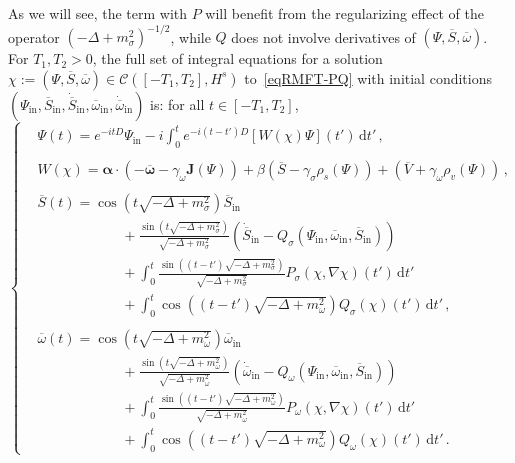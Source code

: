 \documentclass[10pt]{amsart}
\theoremstyle{definition}\newtheorem{defi}[theo]{Definition}\newtheorem{rema}[theo]{Remark}\newtheorem{exam}[theo]{Example}\newtheorem{exem}[theo]{Example}\newtheorem{nota}[theo]{Notation}
\newcommand{\rmin}{\mathrm{in}}
\newcommand{\cC}{\mathcal{C}}
\renewcommand\bar{\overline}
\renewcommand\d[1]{{\ensuremath{\,\text{d}#1}}}
\newcommand{\dps}{\displaystyle}
\begin{document}
As we will see, the term with $P$ will benefit from the regularizing effect of the operator $(-\Delta+m_\sigma^2)^{-1/2}$, while $Q$ does not involve derivatives of $(\Psi, \overline{S}, \overline{\omega})$. For $T_1,T_2>0$, the full set of integral equations for a solution $\chi:=(\Psi, \overline{S}, \overline{\omega})\in\cC([-T_1,T_2],H^s)$ to~\eqref{eqRMFT-PQ} with initial conditions $(\Psi_\rmin, \overline{S}_\rmin, \dot{\overline{S}}_\rmin, \overline{\omega}_\rmin, \dot{\overline{\omega}}_\rmin)$ is: for all $t\in[-T_1,T_2]$,
\begin{equation}
\begin{cases}\label{eq:Phidef}
&\dps\Psi(t) = e^{-itD}\Psi_\rmin -i\int_0^te^{-i(t-t')D}[W(\chi)\Psi](t')
\d t'\,,
\\
\\
&\dps W(\chi) =
\bm \alpha \cdot \left(- \overline{\bm \omega}-\gamma_\omega{\bm J}(\Psi)\right) +\beta \left(\overline{S}-\gamma_\sigma\rho_s(\Psi)\right) +\left(\overline{V}+ \gamma_\omega \rho_v(\Psi)
\right)\,,
\\
\\
& \dps\bar{S}(t)=
\cos\left(t\sqrt{-\Delta + m^2_\sigma}\right)\overline S_\rmin\\
&\dps\qquad\qquad\qquad + \frac{\sin\left(t\sqrt{-\Delta + m^2_\sigma}\right)}{\sqrt{-\Delta + m^2_\sigma}}\left(\dot{\overline{S}}_\rmin -Q_\sigma(\Psi_\rmin, \overline{\omega}_\rmin, \overline{S}_\rmin)\right)
\\&\dps\qquad\qquad\qquad +\int_0^t\frac{\sin\left((t-t')\sqrt{-\Delta + m^2_\sigma}\right)}{\sqrt{-\Delta + m^2_\sigma}}P_\sigma(\chi, \nabla\chi)(t')\d t'\\
&\dps\qquad\qquad\qquad +\int_0^t\cos\left((t-t')\sqrt{-\Delta + m^2_\omega}\right) Q_\sigma(\chi)(t')\d t'
\,, \\
\\
& \dps\bar{\omega}(t)=
\cos\left(t\sqrt{-\Delta + m^2_\omega}\right)\overline{\omega}_\rmin\\
&\dps\qquad\qquad\qquad + \frac{\sin\left(t\sqrt{-\Delta + m^2_\omega}\right)}{\sqrt{-\Delta + m^2_\omega}}\left(\dot{\overline{\omega}}_\rmin - Q_\omega(\Psi_\rmin, \overline{\omega}_\rmin, \overline{S}_\rmin)\right)
\\&\dps\qquad\qquad\qquad +\int_0^t\frac{\sin\left((t-t')\sqrt{-\Delta + m^2_\omega}\right)}{\sqrt{-\Delta + m^2_\omega}}P_\omega(\chi, \nabla\chi)(t')\d t'\\
&\dps\qquad\qquad\qquad +\int_0^t\cos\left((t-t')\sqrt{-\Delta + m^2_\omega}\right) Q_\omega(\chi)(t')\d t'
\,.
\end{cases}
\end{equation}
\end{document}
